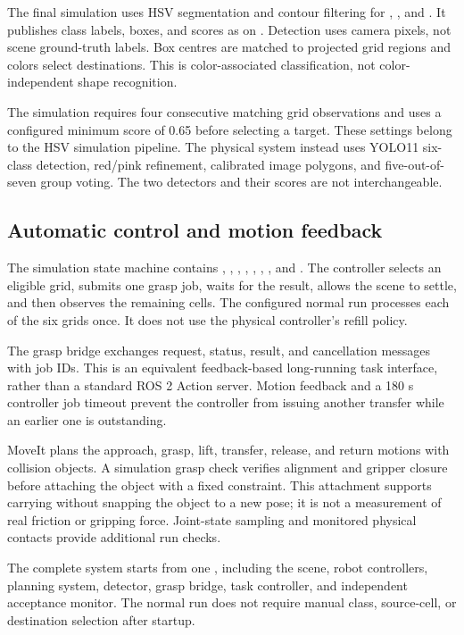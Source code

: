 The final simulation uses HSV segmentation and contour filtering for , , and . It publishes class labels, boxes, and scores as  on . Detection uses camera pixels, not scene ground-truth labels. Box centres are matched to projected grid regions and colors select destinations. This is color-associated classification, not color-independent shape recognition.

The simulation requires four consecutive matching grid observations and uses a configured minimum score of 0.65 before selecting a target. These settings belong to the HSV simulation pipeline. The physical system instead uses YOLO11 six-class detection, red/pink refinement, calibrated image polygons, and five-out-of-seven group voting. The two detectors and their scores are not interchangeable.

\subsection{Automatic control and motion feedback}
The simulation state machine contains , , , , , , , and . The controller selects an eligible grid, submits one grasp job, waits for the result, allows the scene to settle, and then observes the remaining cells. The configured normal run processes each of the six grids once. It does not use the physical controller's refill policy.

The grasp bridge exchanges request, status, result, and cancellation messages with job IDs. This is an equivalent feedback-based long-running task interface, rather than a standard ROS 2 Action server. Motion feedback and a 180 s controller job timeout prevent the controller from issuing another transfer while an earlier one is outstanding.

MoveIt plans the approach, grasp, lift, transfer, release, and return motions with collision objects. A simulation grasp check verifies alignment and gripper closure before attaching the object with a fixed constraint. This attachment supports carrying without snapping the object to a new pose; it is not a measurement of real friction or gripping force. Joint-state sampling and monitored physical contacts provide additional run checks.

The complete system starts from one , including the scene, robot controllers, planning system, detector, grasp bridge, task controller, and independent acceptance monitor. The normal run does not require manual class, source-cell, or destination selection after startup.

